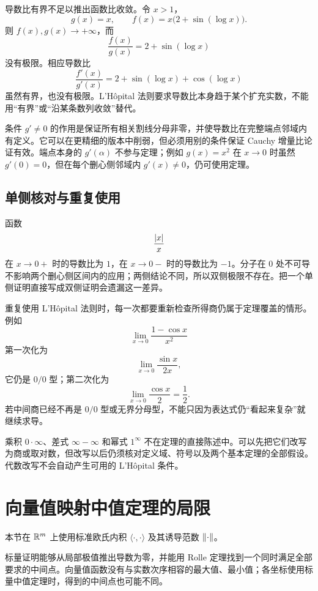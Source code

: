 导数比有界不足以推出函数比收敛。令 \(x>1\)，
\[
 g(x)=x,\qquad f(x)=x\bigl(2+\sin(\log x)\bigr).
\]
则 \(f(x),g(x)\to+\infty\)，而
\[
 \frac{f(x)}{g(x)}=2+\sin(\log x)
\]
没有极限。相应导数比
\[
 \frac{f'(x)}{g'(x)}
 =2+\sin(\log x)+\cos(\log x)
\]
虽然有界，也没有极限。L'Hôpital 法则要求导数比本身趋于某个扩充实数，不能用“有界”或“沿某条数列收敛”替代。

条件 \(g'\ne0\) 的作用是保证所有相关割线分母非零，并使导数比在完整端点邻域内有定义。它可以在更精细的版本中削弱，但必须用别的条件保证 Cauchy 增量比论证有效。端点本身的 \(g'(\alpha)\) 不参与定理；例如 \(g(x)=x^2\) 在 \(x\to0\) 时虽然 \(g'(0)=0\)，但在每个删心侧邻域内 \(g'(x)\ne0\)，仍可使用定理。

\subsection{单侧核对与重复使用}

\begin{example}[两侧结果不同]
函数
\[
 \frac{\left|x\right|}{x}
\]
在 \(x\to0+\) 时的导数比为 \(1\)，在 \(x\to0-\) 时的导数比为 \(-1\)。分子在 \(0\) 处不可导不影响两个删心侧区间内的应用；两侧结论不同，所以双侧极限不存在。把一个单侧证明直接写成双侧证明会遗漏这一差异。
\end{example}

重复使用 L'Hôpital 法则时，每一次都要重新检查所得商仍属于定理覆盖的情形。例如
\[
 \lim_{x\to0}\frac{1-\cos x}{x^2}
\]
第一次化为
\[
 \lim_{x\to0}\frac{\sin x}{2x},
\]
它仍是 \(0/0\) 型；第二次化为
\[
 \lim_{x\to0}\frac{\cos x}{2}=\frac12.
\]
若中间商已经不再是 \(0/0\) 型或无界分母型，不能只因为表达式仍“看起来复杂”就继续求导。

乘积 \(0\cdot\infty\)、差式 \(\infty-\infty\) 和幂式 \(1^\infty\) 不在定理的直接陈述中。可以先把它们改写为商或取对数，但改写以后仍须核对定义域、符号以及两个基本定理的全部假设。代数改写不会自动产生可用的 L'Hôpital 条件。

\section{向量值映射中值定理的局限}
\label{sec:vector-mean-value}

本节在 \(\mathbb{R}^m\) 上使用标准欧氏内积 \(\langle\cdot,\cdot\rangle\) 及其诱导范数 \(\left\lVert\cdot\right\rVert\)。

标量证明能够从局部极值推出导数为零，并能用 Rolle 定理找到一个同时满足全部要求的中间点。向量值函数没有与实数次序相容的最大值、最小值；各坐标使用标量中值定理时，得到的中间点也可能不同。

